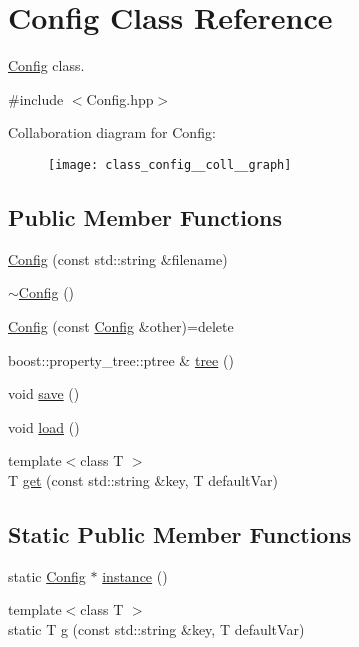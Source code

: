 \hypertarget{class_config}{\section{Config Class Reference}
\label{class_config}
}


\hyperlink{class_config}{Config} class.  




{\ttfamily \#include $<$Config.\-hpp$>$}



Collaboration diagram for Config\-:
\nopagebreak
\begin{figure}[H]
\begin{center}
\leavevmode
\texttt{[image: class\_config\_\_coll\_\_graph]}
\end{center}
\end{figure}
\subsection*{Public Member Functions}
\begin{DoxyCompactItemize}
\item 
\hyperlink{class_config_abc51a2c710c8666d27b53cc03597201d}{Config} (const std\-::string \&filename)
\item 
\hyperlink{class_config_a543dce59b66475c5108088ee4ce1cdfc}{$\sim$\-Config} ()
\item 
\hyperlink{class_config_aea1b7e862074892ee39a5583c342c482}{Config} (const \hyperlink{class_config}{Config} \&other)=delete
\item 
boost\-::property\-\_\-tree\-::ptree \& \hyperlink{class_config_a006701bd126aa5809b3a15e75c63bfb6}{tree} ()
\item 
void \hyperlink{class_config_ae7e68962f22a2c965a61702de1c637db}{save} ()
\item 
void \hyperlink{class_config_add4ebd0c89505c9b5368f03264555606}{load} ()
\item 
{\footnotesize template$<$class T $>$ }\\T \hyperlink{class_config_a1f8e429f853f20cac7cf128f2b71543e}{get} (const std\-::string \&key, T default\-Var)
\end{DoxyCompactItemize}
\subsection*{Static Public Member Functions}
\begin{DoxyCompactItemize}
\item 
static \hyperlink{class_config}{Config} $\ast$ \hyperlink{class_config_abf1d4539011ef83cac0fef2ac864a3a9}{instance} ()
\item 
{\footnotesize template$<$class T $>$ }\\static T \hyperlink{class_config_aaff6aaabead6b7486ec122f9dda807fd}{g} (const std\-::string \&key, T default\-Var)
\end{DoxyCompactItemize}


